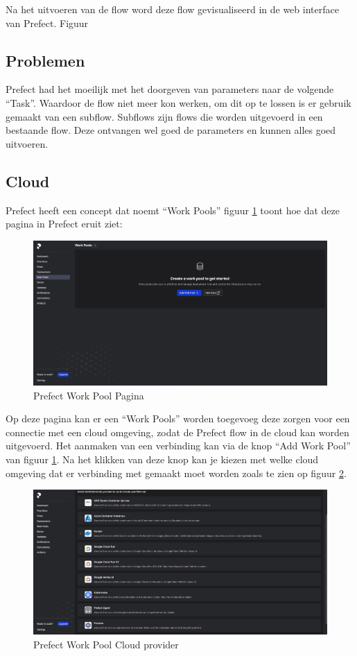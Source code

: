 Na het uitvoeren van de flow word deze flow gevisualiseerd in de web interface van Prefect. Figuur 
\subsection{Problemen}
Prefect had het moeilijk met het doorgeven van parameters naar de volgende ``Task''. Waardoor de flow niet meer kon werken, om dit op te lossen is er gebruik gemaakt van een subflow.
Subflows zijn flows die worden uitgevoerd in een bestaande flow. Deze ontvangen wel goed de parameters en kunnen alles goed uitvoeren.
\subsection{Cloud}
Prefect heeft een concept dat noemt ``Work Pools'' figuur \ref{fig:Prefect_Work_Pools} toont hoe dat deze pagina in Prefect eruit ziet:
\begin{figure}[h]
    \includegraphics[width=\linewidth]{graphics/Prefect_Work_Pools.PNG}
    \caption{Prefect Work Pool Pagina}
    \label{fig:Prefect_Work_Pools}
\end{figure}
Op deze pagina kan er een ``Work Pools'' worden toegevoeg deze zorgen voor een connectie met een cloud omgeving, zodat de Prefect flow in de cloud kan worden uitgevoerd.
Het aanmaken van een verbinding kan via de knop ``Add Work Pool'' van figuur \ref{fig:Prefect_Work_Pools}.
Na het klikken van deze knop kan je kiezen met welke cloud omgeving dat er verbinding met gemaakt moet worden zoals te zien op figuur \ref{fig:Prefect_Work_Pools_Create}.
\begin{figure}[h]
    \includegraphics[width=\linewidth]{graphics/Prefect_Work_Pools_Create.PNG}
    \caption{Prefect Work Pool Cloud provider}
    \label{fig:Prefect_Work_Pools_Create}
\end{figure}
